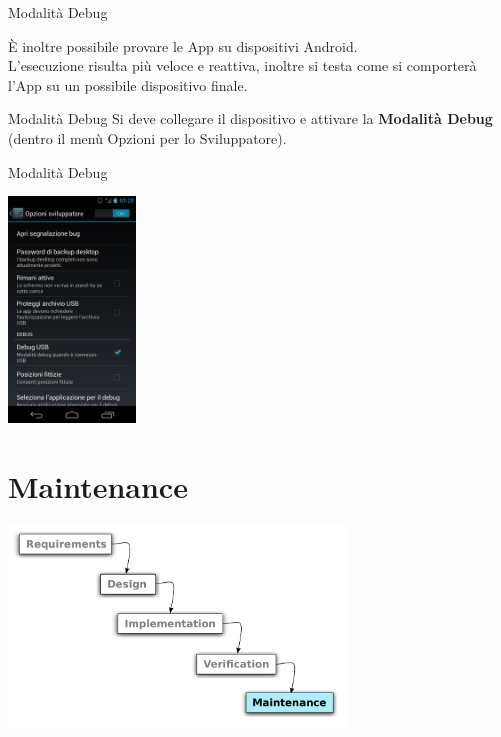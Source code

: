 \documentclass[xcolor=svgnames,11pt]{beamer}
\begin{document}
\begin{frame}{Modalit\`a Debug}

	\`E inoltre possibile provare le App su dispositivi Android.\\
	\pause
	\medskip
	L'esecuzione risulta pi\`u veloce e reattiva, inoltre si testa come si comporter\`a l'App su un possibile dispositivo finale.\\
	\pause
	\medskip
	\begin{block}{Modalit\`a Debug}
	Si deve collegare il dispositivo e attivare la \textbf{Modalit\`a Debug} (dentro il men\`u Opzioni per lo Sviluppatore).
	\end{block}	
\end{frame}


\begin{frame}{Modalit\`a Debug}
\begin{center}
\includegraphics[height=6cm]{debug.png}
\end{center}
\end{frame}

\section{Maintenance}

\begin{frame}
\begin{center}
\includegraphics[width=9cm]{waterfall_5.pdf}
\end{center}
\end{frame}
\end{document}
